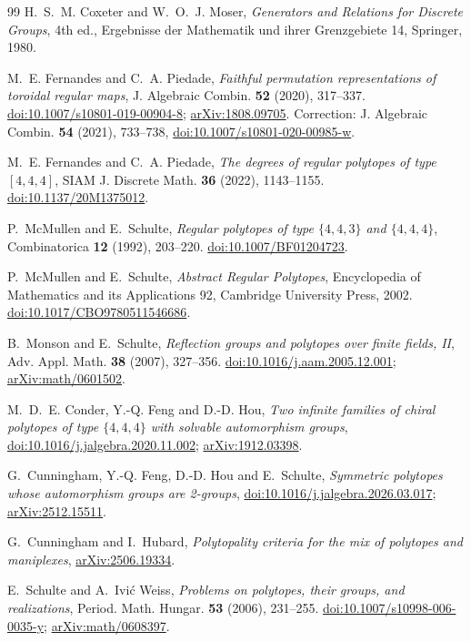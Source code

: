\documentclass[11pt]{article}
\theoremstyle{definition}
\begin{document}
\begin{appendices}
\end{appendices}

\begin{thebibliography}{99}
H.~S.~M. Coxeter and W.~O.~J. Moser,
\emph{Generators and Relations for Discrete Groups}, 4th ed.,
Ergebnisse der Mathematik und ihrer Grenzgebiete 14, Springer, 1980.

M.~E. Fernandes and C.~A. Piedade,
\emph{Faithful permutation representations of toroidal regular maps},
J. Algebraic Combin. \textbf{52} (2020), 317--337.
\href{https://doi.org/10.1007/s10801-019-00904-8}{doi:10.1007/s10801-019-00904-8};
\href{https://arxiv.org/abs/1808.09705}{arXiv:1808.09705}.
Correction: J. Algebraic Combin. \textbf{54} (2021), 733--738,
\href{https://doi.org/10.1007/s10801-020-00985-w}{doi:10.1007/s10801-020-00985-w}.

M.~E. Fernandes and C.~A. Piedade,
\emph{The degrees of regular polytopes of type $[4,4,4]$},
SIAM J. Discrete Math. \textbf{36} (2022), 1143--1155.
\href{https://doi.org/10.1137/20M1375012}{doi:10.1137/20M1375012}.

P.~McMullen and E.~Schulte,
\emph{Regular polytopes of type $\{4,4,3\}$ and $\{4,4,4\}$},
Combinatorica \textbf{12} (1992), 203--220.
\href{https://doi.org/10.1007/BF01204723}{doi:10.1007/BF01204723}.

P.~McMullen and E.~Schulte,
\emph{Abstract Regular Polytopes}, Encyclopedia of Mathematics and its
Applications 92, Cambridge University Press, 2002.
\href{https://doi.org/10.1017/CBO9780511546686}{doi:10.1017/CBO9780511546686}.

B.~Monson and E.~Schulte,
\emph{Reflection groups and polytopes over finite fields, II},
Adv. Appl. Math. \textbf{38} (2007), 327--356.
\href{https://doi.org/10.1016/j.aam.2005.12.001}{doi:10.1016/j.aam.2005.12.001};
\href{https://arxiv.org/abs/math/0601502}{arXiv:math/0601502}.

M.~D.~E. Conder, Y.-Q. Feng and D.-D. Hou,
\emph{Two infinite families of chiral polytopes of type
$\{4,4,4\}$ with solvable automorphism groups},
\href{https://doi.org/10.1016/j.jalgebra.2020.11.002}{doi:10.1016/j.jalgebra.2020.11.002};
\href{https://arxiv.org/abs/1912.03398}{arXiv:1912.03398}.

G.~Cunningham, Y.-Q. Feng, D.-D. Hou and E.~Schulte,
\emph{Symmetric polytopes whose automorphism groups are 2-groups},
\href{https://doi.org/10.1016/j.jalgebra.2026.03.017}{doi:10.1016/j.jalgebra.2026.03.017};
\href{https://arxiv.org/abs/2512.15511}{arXiv:2512.15511}.

G.~Cunningham and I.~Hubard,
\emph{Polytopality criteria for the mix of polytopes and maniplexes},
\href{https://arxiv.org/abs/2506.19334}{arXiv:2506.19334}.

E.~Schulte and A.~Ivi\'c Weiss,
\emph{Problems on polytopes, their groups, and realizations},
Period. Math. Hungar. \textbf{53} (2006), 231--255.
\href{https://doi.org/10.1007/s10998-006-0035-y}{doi:10.1007/s10998-006-0035-y};
\href{https://arxiv.org/abs/math/0608397}{arXiv:math/0608397}.
\end{thebibliography}
\end{document}
